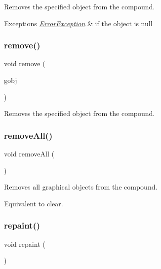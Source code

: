 Removes the specified object from the compound. 


\begin{DoxyExceptions}{Exceptions}
{\em \mbox{\hyperlink{classErrorException}{Error\+Exception}}} & if the object is null \\
\hline
\end{DoxyExceptions}
\mbox{\label{classGCompound_a0c0ae4d69b584602ff3cba0d9cf330a4}} 
\subsubsection{\texorpdfstring{remove()}{remove()}\hspace{0.1cm}{\footnotesize\ttfamily [2/2]}}
{\footnotesize\ttfamily void remove (\begin{DoxyParamCaption}\item[{\mbox{\hyperlink{classGObject}{G\+Object}} \&}]{gobj }\end{DoxyParamCaption})\hspace{0.3cm}{\ttfamily [virtual]}}



Removes the specified object from the compound. 

\mbox{\label{classGCompound_a9b0a5a3ad9972ab0e8eb0b54873aac6b}} 
\subsubsection{\texorpdfstring{remove\+All()}{removeAll()}}
{\footnotesize\ttfamily void remove\+All (\begin{DoxyParamCaption}{ }\end{DoxyParamCaption})\hspace{0.3cm}{\ttfamily [virtual]}}



Removes all graphical objects from the compound. 

Equivalent to clear. \mbox{\label{classGCompound_ac827b978aa122f136a14c198687ad80f}} 
\subsubsection{\texorpdfstring{repaint()}{repaint()}}
{\footnotesize\ttfamily void repaint (\begin{DoxyParamCaption}{ }\end{DoxyParamCaption})\hspace{0.3cm}{\ttfamily [virtual]}}



